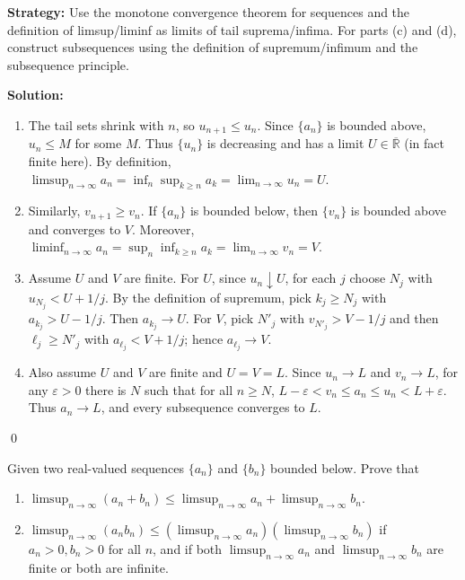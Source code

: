 \noindent\textbf{Strategy:} Use the monotone convergence theorem for sequences and the definition of limsup/liminf as limits of tail suprema/infima. For parts (c) and (d), construct subsequences using the definition of supremum/infimum and the subsequence principle.


\bigskip\noindent\textbf{Solution:}
\begin{enumerate}[label=(\alph*)]
\item The tail sets shrink with \(n\), so \(u_{n+1}\le u_n\). Since \(\{a_n\}\) is bounded above, \(u_n\le M\) for some \(M\). Thus \(\{u_n\}\) is decreasing and has a limit \(U\in\overline{\mathbb{R}}\) (in fact finite here). By definition, \(\limsup_{n\to\infty} a_n=\inf_n \sup_{k\ge n} a_k=\lim_{n\to\infty} u_n=U\).
\item Similarly, \(v_{n+1}\ge v_n\). If \(\{a_n\}\) is bounded below, then \(\{v_n\}\) is bounded above and converges to \(V\). Moreover, \(\liminf_{n\to\infty} a_n=\sup_n \inf_{k\ge n} a_k=\lim_{n\to\infty} v_n=V\).
\item Assume \(U\) and \(V\) are finite. For \(U\), since \(u_n\downarrow U\), for each \(j\) choose \(N_j\) with \(u_{N_j}<U+1/j\). By the definition of supremum, pick \(k_j\ge N_j\) with \(a_{k_j}>U-1/j\). Then \(a_{k_j}\to U\). For \(V\), pick \(N'_j\) with \(v_{N'_j}>V-1/j\) and then \(\ell_j\ge N'_j\) with \(a_{\ell_j}<V+1/j\); hence \(a_{\ell_j}\to V\).
\item Also assume \(U\) and \(V\) are finite and \(U=V=L\). Since \(u_n\to L\) and \(v_n\to L\), for any \(\varepsilon>0\) there is \(N\) such that for all \(n\ge N\), \(L-\varepsilon<v_n\le a_n\le u_n<L+\varepsilon\). Thus \(a_n\to L\), and every subsequence converges to \(L\).
\end{enumerate}\qed


\begin{problembox}
\begin{problemstatement}
Given two real-valued sequences \(\{a_n\}\) and \(\{b_n\}\) bounded below. Prove that
\begin{enumerate}[label=\alph*)]
\item \(\limsup_{n \to \infty} (a_n + b_n) \leq \limsup_{n \to \infty} a_n + \limsup_{n \to \infty} b_n\).
\item \(\limsup_{n \to \infty} (a_n b_n) \leq (\limsup_{n \to \infty} a_n)(\limsup_{n \to \infty} b_n)\) if \(a_n > 0, b_n > 0\) for all \(n\), and if both \(\limsup_{n \to \infty} a_n\) and \(\limsup_{n \to \infty} b_n\) are finite or both are infinite.
\end{enumerate}
\end{problemstatement}
\end{problembox}

